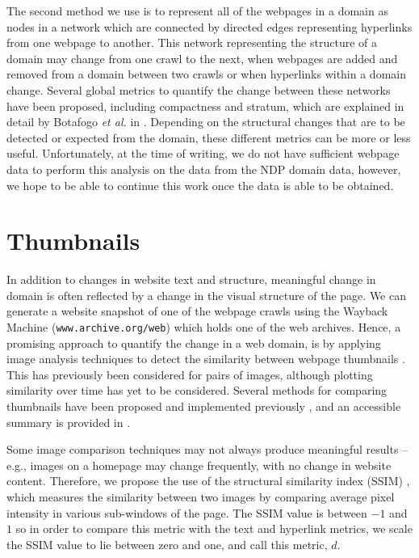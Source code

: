 \documentclass[10pt, a4paper]{article}
\begin{document}
 The second method we use is to represent all of the webpages in a domain as nodes in a network which are connected by directed edges representing hyperlinks from one webpage to another.
 This network representing the structure of a domain may change from one crawl to the next, when webpages are added and removed from a domain between two crawls or when hyperlinks within a domain change.
 Several global metrics to quantify the change between these networks have been proposed, including compactness and stratum, which are explained in detail by Botafogo \textit{et al.} in \cite{botafogo1992structural}.
 Depending on the structural changes that are to be detected or expected from the domain, these different metrics can be more or less useful.
 Unfortunately, at the time of writing, we do not have sufficient webpage data to perform this analysis on the data from the NDP domain data, however, we hope to be able to continue this work once the data is able to be obtained.
\vspace{-3mm}

\section{Thumbnails}
\label{sec:images}
\vspace{-2mm}
 In addition to changes in website text and structure, meaningful change in domain is often reflected by a change in the visual structure of the page.
 We can generate a website snapshot of one of the webpage crawls using the Wayback Machine (\texttt{www.archive.org/web}) which holds one of the web archives.
 Hence, a promising approach to quantify the change in a web domain, is by applying image analysis techniques to detect the similarity between webpage thumbnails \cite{alsum2014thumbnail}.
 This has previously been considered for pairs of images, although plotting similarity over time has yet to be considered.
 Several methods for comparing thumbnails have been proposed and implemented previously \cite{henzinger,broder,manku}, and an accessible summary is provided in \cite{alsum2014thumbnail}.
 
 Some image comparison techniques may not always produce meaningful results -- e.g., images on a homepage may change frequently, with no change in website content.
 Therefore, we propose the use of the structural similarity index (SSIM) \cite{ssim}, which measures the similarity between two images by comparing average pixel intensity in various sub-windows of the page.
 The SSIM value is between $-1$ and $1$ so in order to compare this metric with the text and hyperlink metrics, we scale the SSIM value to lie between zero and one, and call this metric, $d$.
\end{document}
